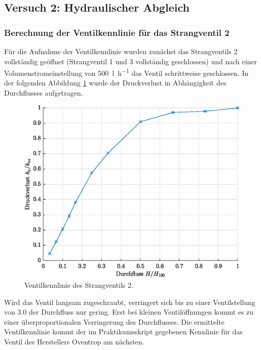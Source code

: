 \subsection{Versuch 2: Hydraulischer Abgleich}

\subsubsection{Berechnung der Ventilkennlinie für das Strangventil 2}
Für die Aufnahme der Ventilkennlinie wurden zunächst das Strangventils 2 vollständig geöffnet (Strangventil 1 und 3 vollständig geschlossen) und nach einer Volumenstromeinstellung von \SI{500}{\litre\per\hour} das Ventil schrittweise geschlossen. In der folgenden Abbildung \ref{fig:Ventil} wurde der Druckverlust in Abhängigkeit des Durchflusses aufgetragen. 

	\begin{figure}[H]
	\centering
	\includegraphics[height=0.4\textheight]{../DATA/Ventilkennlinie.eps}
	\caption[Ventilkennlinie des Strangventils 2]{Ventilkennlinie des Strangventils 2.}
	\label{fig:Ventil}
	\end{figure}

Wird das Ventil langsam zugeschraubt, verringert sich bis zu einer Ventilstellung von \num{3,0} der Durchfluss nur gering. Erst bei kleinen Ventilöffnungen kommt es zu einer überproportionalen Verringerung des Durchflusses. Die ermittelte Ventilkennlinie kommt der im Praktikumsskript gegebenen Kennlinie für das Ventil des Herstellers Oventrop am nächsten. 

